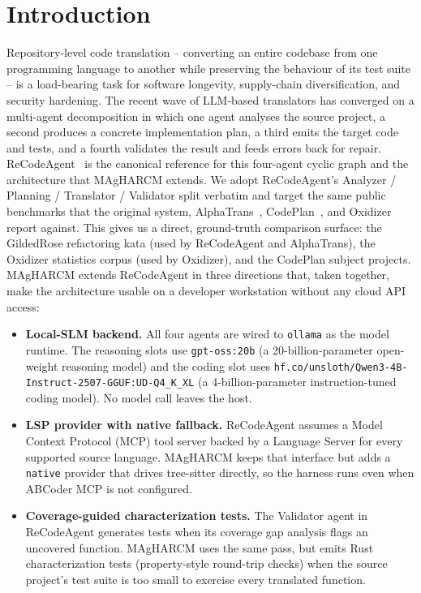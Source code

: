 \section{Introduction}
\label{sec:intro}

Repository-level code translation -- converting an entire codebase from one
programming language to another while preserving the behaviour of its test
suite -- is a load-bearing task for software longevity, supply-chain
diversification, and security hardening. The recent wave of LLM-based
translators has converged on a multi-agent decomposition in which one agent
analyses the source project, a second produces a concrete implementation
plan, a third emits the target code and tests, and a fourth validates the
result and feeds errors back for repair.
ReCodeAgent~\citep{ibrahimzada2025recodeagent} is the canonical reference
for this four-agent cyclic graph and the architecture that MAgHARCM
extends. We adopt ReCodeAgent's Analyzer / Planning / Translator /
Validator split verbatim and target the same public benchmarks that
the original system, AlphaTrans~\citep{alphatrans2025}, CodePlan~\citep{codeplan2023}, and
Oxidizer~\citep{oxidizer2024} report against. This gives us a direct,
ground-truth comparison surface: the GildedRose refactoring kata (used by
ReCodeAgent and AlphaTrans), the Oxidizer statistics corpus (used by
Oxidizer), and the CodePlan subject projects. MAgHARCM extends ReCodeAgent
in three directions that, taken together, make the architecture usable on a
developer workstation without any cloud API access:

\begin{itemize}
\item \textbf{Local-SLM backend.} All four agents are wired to
\texttt{ollama} as the model runtime. The reasoning slots use
\texttt{gpt-oss:20b} (a 20-billion-parameter open-weight reasoning model)
and the coding slot uses
\texttt{hf.co/unsloth/Qwen3-4B-Instruct-2507-GGUF:UD-Q4\_K\_XL} (a
4-billion-parameter instruction-tuned coding model). No model call leaves
the host.

\item \textbf{LSP provider with native fallback.} ReCodeAgent assumes a
Model Context Protocol (MCP) tool server backed by a Language Server for
every supported source language. MAgHARCM keeps that interface but adds a
\texttt{native} provider that drives tree-sitter directly, so the harness
runs even when ABCoder MCP is not configured.

\item \textbf{Coverage-guided characterization tests.} The Validator agent
in ReCodeAgent generates tests when its coverage gap analysis flags an
uncovered function. MAgHARCM uses the same pass, but emits Rust
characterization tests (property-style round-trip checks) when the source
project's test suite is too small to exercise every translated function.

\end{itemize}


